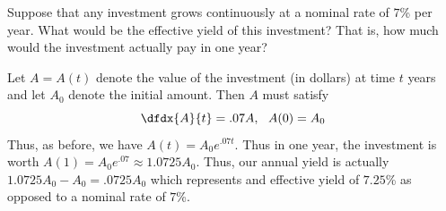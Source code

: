 \begin{myexample}
  Suppose that any investment grows continuously at a nominal rate of
  $7$\% per year.  What would be the effective yield of this
  investment?  That is, how much would the investment actually pay in
  one year?

  Let $A=A(t)$ denote the value of the investment (in dollars) at time $t$
  years and let $A_0$ denote the initial amount.  Then $A$ must
  satisfy
  $$
  \dfdx{A}{t}=.07A,\ \  A(0)=A_0
  $$
  Thus, as before, we have $A(t)=A_0e^{.07t}.$ Thus in one year, the
  investment is worth $A(1)=A_0e^{.07}\approx 1.0725A_0.$ Thus, our
  annual yield is actually $1.0725A_0-A_0=.0725A_0$ which represents
  and effective yield of $7.25$\% as opposed to a nominal
  rate of $7$\%.
\end{myexample}






